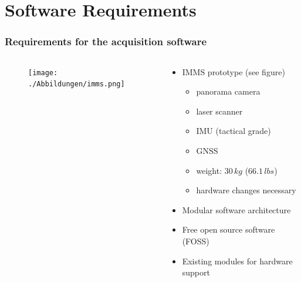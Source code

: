 \documentclass[aspectratio=169]{beamer}
\begin{document}
\begin{frame}
\begin{columns}[onlytextwidth]
\begin{column}{0.5\textwidth}
\begin{center}
    \end{center}
    
    \end{column}
    
   \end{columns}
  \end{frame}


\section{Software Requirements}

  \begin{frame}
   \frametitle{Requirements for the acquisition software}
   \begin{columns}[onlytextwidth]
    \begin{column}{0.5\textwidth}
    
    \begin{figure}[h]
      \centering
      \texttt{[image: ./Abbildungen/imms.png]}
      \label{abb:imms}
    \end{figure}

    \end{column}
    \begin{column}{0.5\textwidth}
      \begin{itemize}
       \item IMMS prototype (see figure)  
       \begin{itemize}
        \item panorama camera
        \item laser scanner
        \item IMU (tactical grade)
        \item GNSS
	\item weight: $30\,kg$ ($66.1\, lbs$)
	\item hardware changes necessary
       \end{itemize}
       \pause
       \item Modular software architecture
       \item Free open source software (FOSS)
       \item Existing modules for hardware support
      \end{itemize}
    \end{column}

   \end{columns}
  \end{frame}
\end{document}
